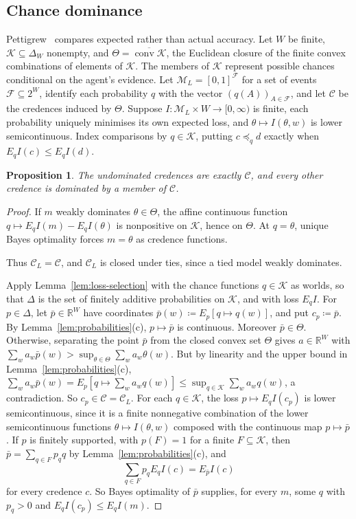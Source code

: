 \documentclass[11pt]{article}
\newtheorem{proposition}[theorem]{Proposition}
\theoremstyle{definition}
\theoremstyle{remark}
\newcommand{\M}{\mathcal M}
\newcommand{\C}{\mathcal C}
\begin{document}
\subsection{Chance dominance}\label{sec:chance}
Pettigrew~\cite[Chapter~10]{Pettigrew2016} compares expected rather than actual accuracy. Let $W$ be finite, $\mathcal K\subseteq\Delta_W$ nonempty, and $\Theta=\overline{\operatorname{conv}\mathcal K}$, the Euclidean closure of the finite convex combinations of elements of $\mathcal K$. The members of $\mathcal K$ represent possible chances conditional on the agent's evidence. Let $\M_L=[0,1]^{\mathcal F}$ for a set of events $\mathcal F\subseteq2^W$, identify each probability $q$ with the vector $(q(A))_{A\in\mathcal F}$, and let $\C$ be the credences induced by $\Theta$. Suppose $I:\M_L\times W\to[0,\infty)$ is finite, each probability uniquely minimises its own expected loss, and $\theta\mapsto I(\theta,w)$ is lower semicontinuous. Index comparisons by $q\in\mathcal K$, putting $c\preceq_q d$ exactly when $E_qI(c)\le E_qI(d)$.
\begin{proposition}\label{prop:short-chance}
The undominated credences are exactly $\C$, and every other credence is dominated by a member of $\C$.
\end{proposition}
\begin{proof}
If $m$ weakly dominates $\theta\in\Theta$, the affine continuous function $q\mapsto E_qI(m)-E_qI(\theta)$ is nonpositive on $\mathcal K$, hence on $\Theta$. At $q=\theta$, unique Bayes optimality forces $m=\theta$ as credence functions. {\color{red}Thus $\C_L=\C$, and $\C_L$ is closed under ties, since a tied model weakly dominates.

Apply Lemma~\ref{lem:loss-selection} with the chance functions $q\in\mathcal K$ as worlds, so that $\Delta$ is the set of finitely additive probabilities on $\mathcal K$, and with loss $E_qI$. For $p\in\Delta$, let $\bar p\in\mathbb R^W$ have coordinates $\bar p(w)\coloneqq E_p[q\mapsto q(w)]$, and put $c_p\coloneqq\bar p$. By Lemma~\ref{lem:probabilities}(c), $p\mapsto\bar p$ is continuous. Moreover $\bar p\in\Theta$. Otherwise, separating the point $\bar p$ from the closed convex set $\Theta$ gives $a\in\mathbb R^W$ with $\sum_wa_w\bar p(w)>\sup_{\theta\in\Theta}\sum_wa_w\theta(w)$. But by linearity and the upper bound in Lemma~\ref{lem:probabilities}(c), $\sum_wa_w\bar p(w)=E_p[q\mapsto\sum_wa_wq(w)]\le\sup_{q\in\mathcal K}\sum_wa_wq(w)$, a contradiction. So $c_p\in\C=\C_L$. For each $q\in\mathcal K$, the loss $p\mapsto E_qI(c_p)$ is lower semicontinuous, since it is a finite nonnegative combination of the lower semicontinuous functions $\theta\mapsto I(\theta,w)$ composed with the continuous map $p\mapsto\bar p$. If $p$ is finitely supported, with $p(F)=1$ for a finite $F\subseteq\mathcal K$, then $\bar p=\sum_{q\in F}p_qq$ by Lemma~\ref{lem:probabilities}(c), and
\[
\sum_{q\in F}p_qE_qI(c)=E_{\bar p}I(c)
\]
for every credence $c$. So Bayes optimality of $\bar p$ supplies, for every $m$, some $q$ with $p_q>0$ and $E_qI(c_p)\le E_qI(m)$.}
\end{proof}
\end{document}
